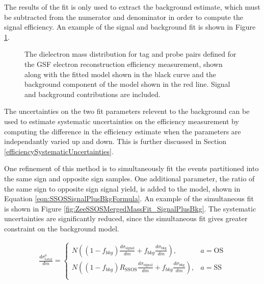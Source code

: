 \documentclass{cmspaper}
\begin{document}
The results of the fit is only used to extract the background estimate, which must be subtracted from the numerator and denominator in order to compute the signal efficiency. An example of the signal and background fit is shown in Figure \ref{fig:ZeeMassFit_SignalPlusBkg}. 

\begin{figure}[htb]
  \begin{center}
    \caption{The dielectron mass distribution for tag and probe pairs defined for the GSF electron reconstruction efficiency measurement, shown along with the fitted model shown in the black curve and the background component of the model shown in the red line. Signal and background contributions are included. }
    \label{fig:ZeeMassFit_SignalPlusBkg}
  \end{center}
\end{figure}

The uncertainties on the two fit parameters relevent to the background can be used to estimate systematic uncertainties on the efficiency measurement by computing the difference in the efficiency estimate when the parameters are independantly varied up and down. This is further discussed in Section \ref{efficiencySystematicUncertainties}.

One refinement of this method is to simultaneously fit the events partitioned into the same sign and opposite sign samples. One additional parameter, the ratio of the same sign to opposite sign signal yield, is added to the model, shown in Equation \ref{eqn:SSOSSignalPlusBkgFormula}.  An example of the simultaneous fit is shown in Figure \ref{fig:ZeeSSOSMergedMassFit_SignalPlusBkg}. The systematic uncertainties are significantly reduced, since the simultaneous fit gives greater constraint on the background model.

\begin{eqnarray}
  \label{eqn:SSOSSignalPlusBkgFormula} 
\frac{d\sigma^{a}_{\mathrm{total}}}{dm} =  
\begin{cases}
  N\left( (1-f_{bkg})\frac{d\sigma_{\mathrm{signal}}}{dm} + f_{bkg} \frac{d\sigma_{\mathrm{bkg}}}{dm} \right), & a = \mathrm{OS} \\
    N\left( (1-f_{bkg})R_{\mathrm{SSOS}}\frac{d\sigma_{\mathrm{signal}}}{dm} + f_{bkg} \frac{d\sigma_{\mathrm{bkg}}}{dm} \right), & a = \mathrm{SS} \\
\end{cases}
\end{eqnarray}
\end{document}
